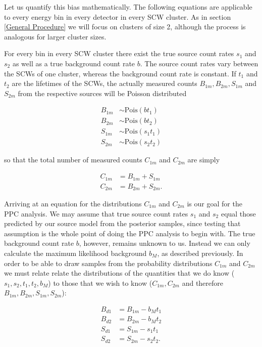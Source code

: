 \documentclass{report}
\begin{document}
Let us quantify this bias mathematically. The following equations are applicable to every energy bin in every detector in every SCW cluster. As in section \ref{General Procedure} we will focus on clusters of size 2, although the process is analogous for larger cluster sizes.

For every bin in every SCW cluster there exist the true source count rates $s_1$ and $s_2$ as well as a true background count rate $b$. The source count rates vary between the SCWs of one cluster, whereas the background count rate is constant. If $t_1$ and $t_2$ are the lifetimes of the SCWs, the actually measured counts $B_{1m}, B_{2m}, S_{1m}$ and $S_{2m}$ from the respective sources will be Poisson distributed

\begin{align} \label{eq measured counts}
    B_{1m} &\sim \text{Pois}(bt_1) \\
    B_{2m} &\sim \text{Pois}(bt_2) \\
    S_{1m} &\sim \text{Pois}(s_1t_1) \\
    S_{2m} &\sim \text{Pois}(s_2t_2)
\end{align}

so that the total number of measured counts $C_{1m}$ and $C_{2m}$ are simply

\begin{align} \label{eq tot counts ppc}
    C_{1m} &= B_{1m} + S_{1m} \\
    C_{2m} &= B_{2m} + S_{2m}.
\end{align}

Arriving at an equation for the distributions $C_{1m}$ and $C_{2m}$ is our goal for the PPC analysis. We may assume that true source count rates $s_1$ and $s_2$ equal those predicted by our source model from the posterior samples, since testing that assumption is the whole point of doing the PPC analysis to begin with. The true background count rate $b$, however, remains unknown to us. Instead we can only calculate the maximum likelihood background $b_M$, as described previously. In order to be able to draw samples from the probability distributions $C_{1m}$ and $C_{2m}$ we must relate relate the distributions of the quantities that we do know ($s_1, s_2, t_1, t_2, b_M$) to those that we wish to know ($C_{1m}, C_{2m}$ and therefore $B_{1m}, B_{2m}, S_{1m}, S_{2m}$):

\begin{align} \label{eq ppc dif}
    B_{d1} &= B_{1m} - b_Mt_1 \\
    B_{d2} &= B_{2m} - b_Mt_2 \\
    S_{d1} &= S_{1m} - s_1t_1 \\
    S_{d2} &= S_{2m} - s_2t_2.
\end{align}
\end{document}
